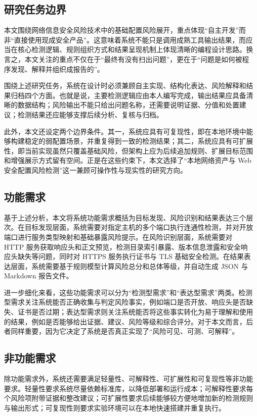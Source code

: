 \documentclass[12pt,a4paper,fontset=none]{ctexart}
\begin{document}
\subsection{研究任务边界}

本文围绕网络信息安全风险技术中的基础配置风险展开，重点体现“自主开发”而非“直接使用现成安全产品”。这意味着系统不能只是调用成熟工具输出结果，而应当在核心检测逻辑、规则组织方式和结果呈现机制上体现清晰的编程设计思路。换言之，本文关注的重点不仅在于“最终有没有扫出问题”，更在于“问题是如何被程序发现、解释并组织成报告的”。

围绕上述研究任务，系统在设计时必须兼顾自主实现、结构化表达、风险解释和结果归档四个方面。也就是说，主要检测逻辑应由本人编写完成，输出结果应具备清晰的数据结构；风险输出不能只给出问题名称，还需要说明证据、分值和处置建议；检测结果还应能够支撑后续分析、复核与归档。

此外，本文还设定两个边界条件。其一，系统应具有可复现性，即在本地环境中能够构建稳定的弱配置场景，并重复得到一致的检测结果；其二，系统应具有可扩展性，即当前实现虽然只覆盖基础风险，但架构上应为后续追加规则、扩展目标范围和增强展示方式留有空间。正是在这些约束下，本文选择了“本地网络资产与 Web 安全配置风险检测”这一兼顾可操作性与现实性的研究方向。

\subsection{功能需求}

基于上述分析，本文将系统功能需求概括为目标发现、风险识别和结果表达三个层次。在目标发现层面，系统需要对指定主机的多个端口执行连通性检测，并对开放端口进行服务类型映射和基础暴露风险提示。在风险识别层面，系统需要对 HTTP 服务获取响应头和正文预览，检测目录索引暴露、版本信息泄露和安全响应头缺失等问题，同时对 HTTPS 服务执行证书与 TLS 基础安全检测。在结果表达层面，系统需要基于规则模型计算风险总分和总体等级，并自动生成 JSON 与 Markdown 报告文件。

进一步细化来看，这些功能需求可以分为“检测型需求”和“表达型需求”两类。检测型需求关注系统能否正确收集与判定风险事实，例如端口是否开放、响应头是否缺失、证书是否过期；表达型需求则关注系统能否将这些事实转化为易于理解和使用的结果，例如是否能够给出证据、建议、风险等级和综合评分。对于本文而言，后者同样重要，因为它决定了系统是否真正实现了“风险可见、可测、可解释”。

\subsection{非功能需求}

除功能需求外，系统还需要满足轻量性、可解释性、可扩展性和可复现性等非功能要求。轻量性要求系统尽量依赖标准库，以降低部署和运行成本；可解释性要求每个风险项附带证据和整改建议；可扩展性要求后续能够较方便地增加新的检测规则与输出形式；可复现性则要求实验环境可以在本地快速搭建并重复执行。
\end{document}
